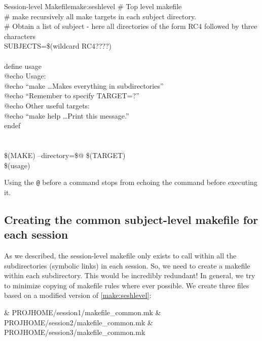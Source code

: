 \begin{make}{Session-level Makefile}{make:seshlevel}
	\# Top level makefile \\
	\# make recursively all make targets in each subject directory.\\
	
	\# Obtain a list of subject - here all directories of the form RC4 followed by three characters \\
	SUBJECTS=\$(wildcard RC4????) \\
	
	 \\
	
	define usage \\
	\tab @echo Usage: \\
	\tab @echo ``make \ldots Makes everything in subdirectories'' \\
	\tab @echo ``\tab Remember to specify TARGET=?'' \\
	\tab @echo Other useful targets: \\
	\tab @echo ``make help \ldots Print this message.'' \\
	endef \\
	
	 \\
	
	 \\
	\tab \$(MAKE) --directory=\$@ \$(TARGET)  \\
	
	\tab \$(usage)
\end{make}

Using the \texttt{@} before a command stops \maken{} from echoing the command before executing it.

\subsection{Creating the common subject-level makefile for each session}
As we described, the session-level makefile only exists to call \maken{} within all the subdirectories (symbolic links) in each session. So, we need to create a makefile within each subdirectory. This would be incredibly redundant! In general, we try to minimize copying of makefile rules where ever possible. We create three files based on a modified version of \autoref{make:seshlevel}:

\ttfamily\selectfont
\begin{easylist}[itemize]
	& PROJHOME/session1/makefile_common.mk
	& PROJHOME/session2/makefile_common.mk
	& PROJHOME/session3/makefile_common.mk
\end{easylist}
\normalfont

